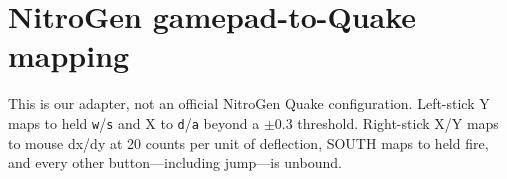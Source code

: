 \documentclass[11pt]{article}
\begin{document}
\section{NitroGen gamepad-to-Quake mapping}\label{app:mapping}

This is our adapter, not an official NitroGen Quake configuration. Left-stick Y maps to held \texttt{w}/\texttt{s} and X to \texttt{d}/\texttt{a} beyond a $\pm0.3$ threshold. Right-stick X/Y maps to mouse dx/dy at 20 counts per unit of deflection, SOUTH maps to held fire, and every other button---including jump---is unbound.
\end{document}
